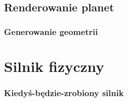\documentclass{beamer}
\begin{document}
\subsection{Renderowanie planet}\label{sub:renderowanie planet}

\frame
{
	\frametitle{Generowanie geometrii}
}

\section{Silnik fizyczny}\label{sec:silnik fizyczny}
\frame{ \tableofcontents[currentsection] }

\frame
{
	\frametitle{Kiedyś-będzie-zrobiony silnik}
}



\end{document}
